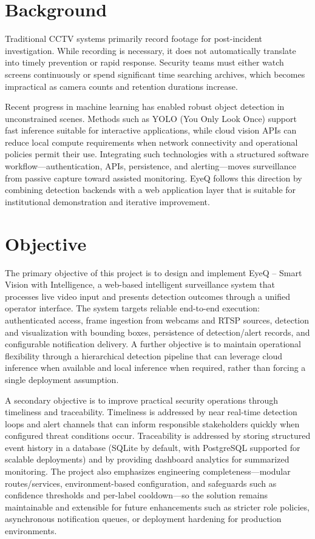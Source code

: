 \documentclass[10pt,openany]{report}
\begin{document}
\begin{sloppypar}
{{{\begin{sloppypar}
\linespread{1.5}
\section{Background}
\hspace{0.4cm}
Traditional CCTV systems primarily record footage for post-incident investigation. While recording is necessary, it does not automatically translate into timely prevention or rapid response. Security teams must either watch screens continuously or spend significant time searching archives, which becomes impractical as camera counts and retention durations increase.

Recent progress in machine learning has enabled robust object detection in unconstrained scenes. Methods such as YOLO (You Only Look Once) support fast inference suitable for interactive applications, while cloud vision APIs can reduce local compute requirements when network connectivity and operational policies permit their use. Integrating such technologies with a structured software workflow---authentication, APIs, persistence, and alerting---moves surveillance from passive capture toward assisted monitoring. EyeQ follows this direction by combining detection backends with a web application layer that is suitable for institutional demonstration and iterative improvement.
\section{Objective}
The primary objective of this project is to design and implement EyeQ -- Smart Vision with Intelligence, a web-based intelligent surveillance system that processes live video input and presents detection outcomes through a unified operator interface. The system targets reliable end-to-end execution: authenticated access, frame ingestion from webcams and RTSP sources, detection and visualization with bounding boxes, persistence of detection/alert records, and configurable notification delivery. A further objective is to maintain operational flexibility through a hierarchical detection pipeline that can leverage cloud inference when available and local inference when required, rather than forcing a single deployment assumption.

A secondary objective is to improve practical security operations through timeliness and traceability. Timeliness is addressed by near real-time detection loops and alert channels that can inform responsible stakeholders quickly when configured threat conditions occur. Traceability is addressed by storing structured event history in a database (SQLite by default, with PostgreSQL supported for scalable deployments) and by providing dashboard analytics for summarized monitoring. The project also emphasizes engineering completeness---modular routes/services, environment-based configuration, and safeguards such as confidence thresholds and per-label cooldown---so the solution remains maintainable and extensible for future enhancements such as stricter role policies, asynchronous notification queues, or deployment hardening for production environments.


\end{sloppypar}}}}
\end{sloppypar}
\end{document}
